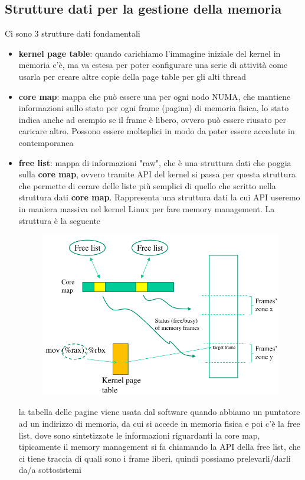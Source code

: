 \documentclass[12pt, oneside]{extbook}
\begin{document}
\subsection{Strutture dati per la gestione della memoria}
Ci sono 3 strutture dati fondamentali
\begin{itemize}
\item \textbf{kernel page table}: quando carichiamo l'immagine iniziale del kernel in memoria c'è, ma va estesa per poter configurare una serie di attività come usarla per creare altre copie della page table per gli alti thread
\item \textbf{core map}: mappa che può essere una per ogni nodo NUMA, che mantiene informazioni sullo stato per ogni frame (pagina) di memoria fisica, lo stato indica anche ad esempio se il frame è libero, ovvero può essere riusato per caricare altro. Possono essere molteplici in modo da poter essere accedute in contemporanea
\item \textbf{free list}: mappa di informazioni "raw", che è una struttura dati che poggia sulla \textbf{core map}, ovvero tramite API del kernel si passa per questa struttura che permette di cerare delle liste più semplici di quello che  scritto nella struttura dati \textbf{core map}. Rappresenta una struttura dati la cui API useremo in maniera massiva nel kernel Linux per fare memory management. La struttura è la seguente
\begin{figure}[!h]
	\includegraphics[scale=0.5]{immagini/free_list_schema.png}
\end{figure}
la tabella delle pagine viene usata dal software quando abbiamo un puntatore ad un indirizzo di memoria, da cui si accede in memoria fisica e poi c'è la free list, dove sono sintetizzate le informazioni riguardanti la core map, tipicamente il memory management si fa chiamando la API della free list, che ci tiene traccia di quali sono i frame liberi, quindi possiamo prelevarli/darli da/a sottosistemi
\end{itemize}
\end{document}
